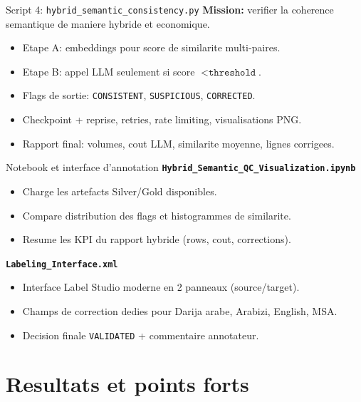 \documentclass[10pt,aspectratio=169]{beamer}
\begin{document}
\begin{frame}{Script 4: \texttt{hybrid\_semantic\_consistency.py}}
  \textbf{Mission:} verifier la coherence semantique de maniere hybride et economique.

  \vspace{0.2cm}
  \begin{itemize}
    \item Etape A: embeddings pour score de similarite multi-paires.
    \item Etape B: appel LLM seulement si score $< \texttt{threshold}$.
    \item Flags de sortie: \texttt{CONSISTENT}, \texttt{SUSPICIOUS}, \texttt{CORRECTED}.
    \item Checkpoint + reprise, retries, rate limiting, visualisations PNG.
    \item Rapport final: volumes, cout LLM, similarite moyenne, lignes corrigees.
  \end{itemize}
\end{frame}

\begin{frame}{Notebook et interface d'annotation}
  \textbf{\texttt{Hybrid\_Semantic\_QC\_Visualization.ipynb}}
  \begin{itemize}
    \item Charge les artefacts Silver/Gold disponibles.
    \item Compare distribution des flags et histogrammes de similarite.
    \item Resume les KPI du rapport hybride (rows, cout, corrections).
  \end{itemize}

  \vspace{0.2cm}
  \textbf{\texttt{Labeling\_Interface.xml}}
  \begin{itemize}
    \item Interface Label Studio moderne en 2 panneaux (source/target).
    \item Champs de correction dedies pour Darija arabe, Arabizi, English, MSA.
    \item Decision finale \texttt{VALIDATED} + commentaire annotateur.
  \end{itemize}
\end{frame}

\section{Resultats et points forts}
\end{document}
